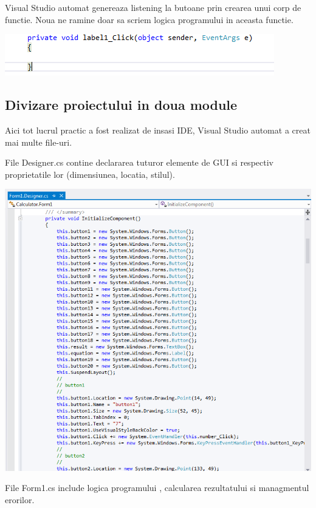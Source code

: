 \documentclass[a4paper, 12pt]{article}
\begin{document}
Visual Studio automat genereaza listening la butoane prin crearea unui corp de functie. Noua ne ramine doar sa scriem logica programului in aceasta functie.

\includegraphics*{listen}

\subsection{Divizare proiectului in doua module }
Aici tot lucrul practic a fost realizat de insasi IDE, Visual Studio automat a creat mai multe file-uri.

File Designer.cs contine declararea tuturor elemente de GUI
si respectiv proprietatile lor (dimensiunea, locatia, stilul).

\includegraphics*{gui_gen}

File Form1.cs include logica programului , calcularea rezultatului si managmentul erorilor.
\end{document}
